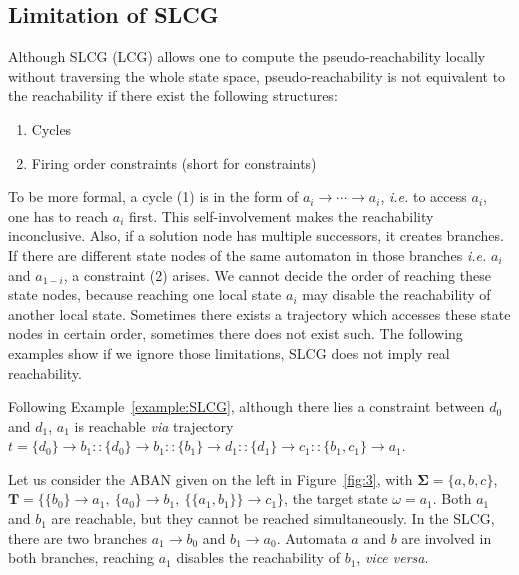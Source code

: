 \documentclass[runningheads]{llncs}
\newcommand{\acm}[3]{\{#1\}\rightarrow#3}
\begin{document}
\subsection{Limitation of SLCG}\label{limitation}
Although SLCG (LCG) allows one to compute the pseudo-reachability locally without traversing the whole state space, pseudo-reachability is not equivalent to the reachability if there exist the following structures:
\begin{enumerate}[label={(\arabic*)}]
\item Cycles
\item Firing order constraints (short for constraints)
\end{enumerate}
To be more formal, a cycle (1) is in the form of $a_i\to\cdots\to a_i$, \textit{i.e.} to access $a_i$, one has to reach $a_i$ first. This self-involvement makes the reachability inconclusive. 
Also, if a solution node has multiple successors, it creates branches.
If there are different state nodes of the same automaton in those branches \textit{i.e.} $a_i$ and $a_{1-i}$, a constraint (2) arises. 
We cannot decide the order of reaching these state nodes, because reaching one local state $a_i$ may disable the reachability of another local state.
Sometimes there exists a trajectory which accesses these state nodes in certain order, sometimes there does not exist such.
The following examples show if we ignore those limitations, SLCG does not imply real reachability.


\begin{example}\label{example:reach}
Following Example~\ref{example:SLCG}, although there lies a constraint between $d_0$ and $d_1$, $a_1$ is reachable \textit{via} trajectory $t=\acm{d_0}{b_0}{b_1}::\acm{d_0}{b_0}{b_1}::\acm{b_1}{d_0}{d_1}::\acm{d_1}{c_0}{c_1}::\acm{b_1,c_1}{a_0}{a_1}$.
\end{example}

\begin{example}\label{example:unreach}
Let us consider the ABAN given on the left in Figure~\ref{fig:3}, with $\mathbf{\Sigma}=\{a,b,c\}$, $\mathbf{T}=\{\acm{b_0}{a_0}{a_1},\ \acm{a_0}{b_0}{b_1},\ \acm{\{a_1,b_1\}}{c_0}{c_1}\}$, the target state $\omega=a_1$. 
Both $a_1$ and $b_1$ are reachable, but they cannot be reached simultaneously.
In the SLCG, there are two branches $a_1\to b_0$ and $b_1\to a_0$.
Automata $a$ and $b$ are involved in both branches, reaching $a_1$ disables the reachability of $b_1$, \textit{vice versa}.
\end{example}
\end{document}
